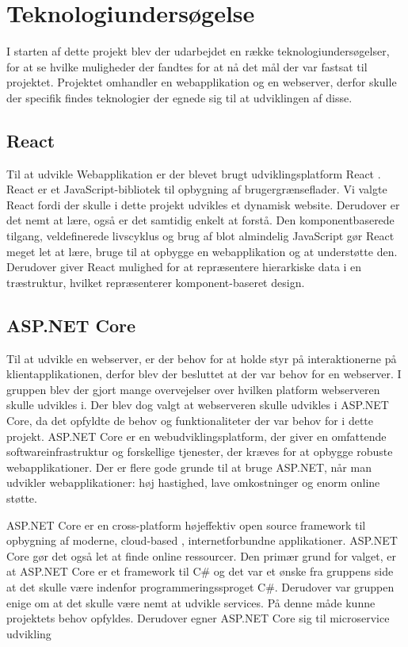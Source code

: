 \chapter{Teknologiundersøgelse}

I starten af dette projekt blev der udarbejdet en række teknologiundersøgelser, for at se hvilke muligheder der fandtes for at nå det mål der var fastsat til projektet. Projektet omhandler en webapplikation og en webserver, derfor skulle der specifik findes teknologier der egnede sig til at udviklingen af disse.    

\section{React}

Til at udvikle Webapplikation er der blevet brugt udviklingsplatform React \cite[React]{converge-terms}. React er et JavaScript-bibliotek til opbygning af brugergrænseflader. Vi valgte React fordi der skulle i dette projekt udvikles et dynamisk website. Derudover er det nemt at lære, også er det samtidig enkelt at forstå. Den komponentbaserede tilgang, veldefinerede livscyklus og brug af blot almindelig JavaScript gør React meget let at lære, bruge til at opbygge en webapplikation og at understøtte den. Derudover giver React mulighed for at repræsentere hierarkiske data i en træstruktur, hvilket repræsenterer komponent-baseret design.

\section{ASP.NET Core}

Til at udvikle en webserver, er der behov for at holde styr på interaktionerne på klientapplikationen, derfor blev der besluttet at der var behov for en webserver. I gruppen blev der gjort mange overvejelser over hvilken platform webserveren skulle udvikles i. Der blev dog valgt at webserveren skulle udvikles i ASP.NET Core, da det opfyldte de behov og funktionaliteter der var behov for i dette projekt. ASP.NET Core er en webudviklingsplatform, der giver en omfattende softwareinfrastruktur \cite[Softwareinfrastruktur]{converge-terms} og forskellige tjenester, der kræves for at opbygge robuste webapplikationer. Der er flere gode grunde til at bruge ASP.NET, når man udvikler webapplikationer: høj hastighed, lave omkostninger og enorm online støtte. 

ASP.NET Core er en cross-platform højeffektiv open source framework til opbygning af moderne, cloud-based \cite[Cloud Based]{converge-terms}, internetforbundne applikationer. ASP.NET Core gør det også let at finde online ressourcer. Den primær grund for valget, er at ASP.NET Core er et framework til C\# og det var et ønske fra gruppens side at det skulle være indenfor programmeringssproget C\#. Derudover var gruppen enige om at det skulle være nemt at udvikle services. På denne måde kunne projektets behov opfyldes. Derudover egner ASP.NET Core sig til microservice \cite[Microservice]{converge-terms} udvikling


